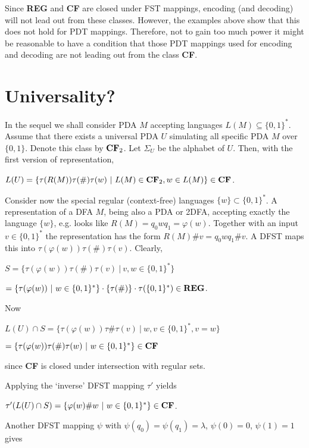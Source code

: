 \documentclass{eptcs}
\begin{document}
Since {\bf REG} and {\bf CF} are closed under FST mappings, encoding (and
decoding) will not lead out from these classes. However, the examples
above show that this does not hold for PDT mappings. Therefore, not to gain too
much power it might be reasonable to have a condition that those PDT mappings
used for encoding and decoding are not leading out from the class {\bf CF}.

\section{Universality?}

In the sequel we shall consider PDA $M$ accepting languages $L(M)\subseteq\{0,1\}^*$.
Assume that there exists a universal PDA $U$ simulating all specific PDA $M$ over
$\{0,1\}$. Denote this class by ${\bf CF}_2$.
Let $\Sigma_U$ be the alphabet of $U$. Then, with the first version of
representation,

$L(U) = \{\tau(R(M))\tau({\#})\tau(w)\ |\ L(M)\in {\mathbf C}{\mathbf F}_2,
 w\in L(M)\} \in {\bf CF}$.

Consider now the special regular (context-free) languages $\{w\}\subset\{0,1\}^*$.
A representation of a DFA $M$, being also a PDA or 2DFA, accepting exactly
the language $\{w\}$,
e.g. looks like
\mbox{$R(M)=q_0wq_1=\varphi(w)$}.
Together with an input $v\in\{0,1\}^*$ the representation has the form
$R(M){\#}v=q_0wq_1{\#}v$.
A DFST maps this into $\tau(\varphi(w))\tau({\#})\tau(v)$.
Clearly,

$S=\{\tau(\varphi(w))\tau({\#})\tau(v)\ |\ v,w\in\{0,1\}^*\}$

\hspace{.5cm}$=\{\tau(\varphi(w))\ |\ w\in\{0,1\}^*\}\cdot\{\tau({\#})\}\cdot
\tau(\{0,1\}^*)
\in {\bf REG}$.

Now 

$L(U)\cap S = \{\tau(\varphi(w))\tau{\#}\tau(v)\ |\
w,v \in\{0,1\}^*, v=w\}$

\hspace{1cm}$=\{\tau(\varphi(w))\tau({\#})\tau(w)\ |\ w\in\{0,1\}^*\} \in {\bf CF}$

since {\bf CF} is closed under intersection with regular sets.

Applying the `inverse' DFST mapping $\tau'$ yields

$\tau'(L(U)\cap S) = \{\varphi(w){\#}w\ |\ w\in\{0,1\}^*\}\in {\bf CF}$.

Another DFST mapping $\psi$ with $\psi(q_0)=\psi(q_1)=\lambda$, $\psi(0)=0$,
$\psi(1)=1$ gives
\end{document}

